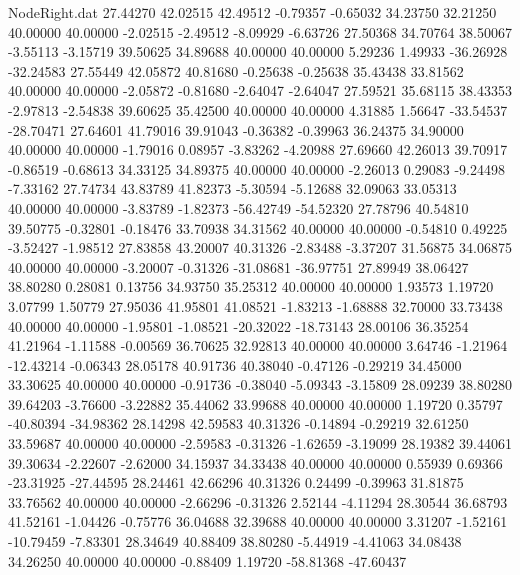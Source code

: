 \begin{filecontents}{NodeRight.dat}
  27.44270   42.02515   42.49512    -0.79357   -0.65032   34.23750   32.21250   40.00000   40.00000   -2.02515   -2.49512   -8.09929   -6.63726
  27.50368   34.70764   38.50067    -3.55113   -3.15719   39.50625   34.89688   40.00000   40.00000    5.29236    1.49933  -36.26928  -32.24583
  27.55449   42.05872   40.81680    -0.25638   -0.25638   35.43438   33.81562   40.00000   40.00000   -2.05872   -0.81680   -2.64047   -2.64047
  27.59521   35.68115   38.43353    -2.97813   -2.54838   39.60625   35.42500   40.00000   40.00000    4.31885    1.56647  -33.54537  -28.70471
  27.64601   41.79016   39.91043    -0.36382   -0.39963   36.24375   34.90000   40.00000   40.00000   -1.79016    0.08957   -3.83262   -4.20988
  27.69660   42.26013   39.70917    -0.86519   -0.68613   34.33125   34.89375   40.00000   40.00000   -2.26013    0.29083   -9.24498   -7.33162
  27.74734   43.83789   41.82373    -5.30594   -5.12688   32.09063   33.05313   40.00000   40.00000   -3.83789   -1.82373  -56.42749  -54.52320
  27.78796   40.54810   39.50775    -0.32801   -0.18476   33.70938   34.31562   40.00000   40.00000   -0.54810    0.49225   -3.52427   -1.98512
  27.83858   43.20007   40.31326    -2.83488   -3.37207   31.56875   34.06875   40.00000   40.00000   -3.20007   -0.31326  -31.08681  -36.97751
  27.89949   38.06427   38.80280     0.28081    0.13756   34.93750   35.25312   40.00000   40.00000    1.93573    1.19720    3.07799    1.50779
  27.95036   41.95801   41.08521    -1.83213   -1.68888   32.70000   33.73438   40.00000   40.00000   -1.95801   -1.08521  -20.32022  -18.73143
  28.00106   36.35254   41.21964    -1.11588   -0.00569   36.70625   32.92813   40.00000   40.00000    3.64746   -1.21964  -12.43214   -0.06343
  28.05178   40.91736   40.38040    -0.47126   -0.29219   34.45000   33.30625   40.00000   40.00000   -0.91736   -0.38040   -5.09343   -3.15809
  28.09239   38.80280   39.64203    -3.76600   -3.22882   35.44062   33.99688   40.00000   40.00000    1.19720    0.35797  -40.80394  -34.98362
  28.14298   42.59583   40.31326    -0.14894   -0.29219   32.61250   33.59687   40.00000   40.00000   -2.59583   -0.31326   -1.62659   -3.19099
  28.19382   39.44061   39.30634    -2.22607   -2.62000   34.15937   34.33438   40.00000   40.00000    0.55939    0.69366  -23.31925  -27.44595
  28.24461   42.66296   40.31326     0.24499   -0.39963   31.81875   33.76562   40.00000   40.00000   -2.66296   -0.31326    2.52144   -4.11294
  28.30544   36.68793   41.52161    -1.04426   -0.75776   36.04688   32.39688   40.00000   40.00000    3.31207   -1.52161  -10.79459   -7.83301
  28.34649   40.88409   38.80280    -5.44919   -4.41063   34.08438   34.26250   40.00000   40.00000   -0.88409    1.19720  -58.81368  -47.60437

\end{filecontents}
